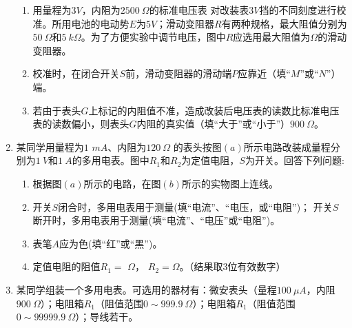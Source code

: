 \begin{enumerate}[leftmargin=0em]
\begin{enumerate}
\item 
用量程为$ 3V $，内阻为$ 2500 \ \Omega $的标准电压表 \voltmetermytikz 对改装表$ 3V $挡的不同刻度进行校准。所用电池的电动势$ E $为$ 5V $；滑动变阻器$ R $有两种规格，最大阻值分别为$ 50 \ \Omega $和$ 5 \ k\Omega $。为了方便实验中调节电压，图中$ R $应选用最大阻值为$ \Omega $的滑动变阻器。
\item 
校准时，在闭合开关$ S $前，滑动变阻器的滑动端$ P $应靠近（填“$ M $”或“$ N $”）端。
\item 
若由于表头$ G $上标记的内阻值不准，造成改装后电压表的读数比标准电压表的读数偏小，则表头$ G $内阻的真实值（填“大于”或“小于”）$ 900 \ \Omega $。



\end{enumerate}





\item 
{}
某同学用量程为$ 1 $ $ mA $、内阻为$ 120 \ \Omega $ 的表头按图$ (a) $所示电路改装成量程分别为$ 1\ V $和$ 1\ A $的多用电表。图中$ R_{1} $和$ R_{2} $为定值电阻，$ S $为开关。回答下列问题$ : $
\begin{enumerate}
\renewcommand{\labelenumii}{(\arabic{enumii})}
\item 
根据图$ (a) $所示的电路，在图$ (b) $所示的实物图上连线。
\begin{figure}[h!]
\centering

\end{figure}


\item 
开关$ S $闭合时，多用电表用于测量(填“电流”、“电压，或“电阻”)；
开关$ S $断开时，多用电表用于测量(填“电流”、“电压”或“电阻”)。


\item 
表笔$ A $应为色(填“红”或“黑”)。


\item 
定值电阻的阻值$ R_{1} = $  $\Omega $，
$ R_{2} = $$\Omega $。（结果取$ 3 $位有效数字）


\end{enumerate}



\newpage

\item 
{}
某同学组装一个多用电表。可选用的器材有：微安表头（量程$ 100\ \mu A $，内阻$ 900\ \Omega $）；电阻箱$ R_{1} $（阻值范围$ 0 \sim 999.9 \ \Omega $）；电阻箱$ R_{1} $（阻值范围$ 0 \sim 99999.9 \ \Omega $）；导线若干。


\end{enumerate}
